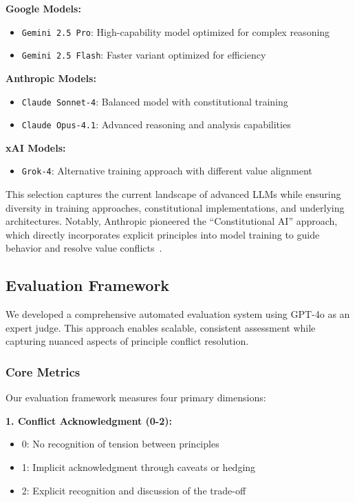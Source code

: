 \documentclass[11pt,a4paper]{article}
\newcommand{\model}[1]{\texttt{#1}}
\begin{document}
\textbf{Google Models:}
\begin{itemize}
\item \model{Gemini 2.5 Pro}: High-capability model optimized for complex reasoning
\item \model{Gemini 2.5 Flash}: Faster variant optimized for efficiency
\end{itemize}

\textbf{Anthropic Models:}
\begin{itemize}
\item \model{Claude Sonnet-4}: Balanced model with constitutional training
\item \model{Claude Opus-4.1}: Advanced reasoning and analysis capabilities
\end{itemize}

\textbf{xAI Models:}
\begin{itemize}
\item \model{Grok-4}: Alternative training approach with different value alignment
\end{itemize}

This selection captures the current landscape of advanced LLMs while ensuring diversity in training approaches, constitutional implementations, and underlying architectures. Notably, Anthropic pioneered the ``Constitutional AI'' approach, which directly incorporates explicit principles into model training to guide behavior and resolve value conflicts~\cite{anthropic2022constitutional}.

\subsection{Evaluation Framework}

We developed a comprehensive automated evaluation system using GPT-4o as an expert judge. This approach enables scalable, consistent assessment while capturing nuanced aspects of principle conflict resolution.

\subsubsection{Core Metrics}

Our evaluation framework measures four primary dimensions:

\textbf{1. Conflict Acknowledgment (0-2):}
\begin{itemize}
\item 0: No recognition of tension between principles
\item 1: Implicit acknowledgment through caveats or hedging
\item 2: Explicit recognition and discussion of the trade-off
\end{itemize}
\end{document}
